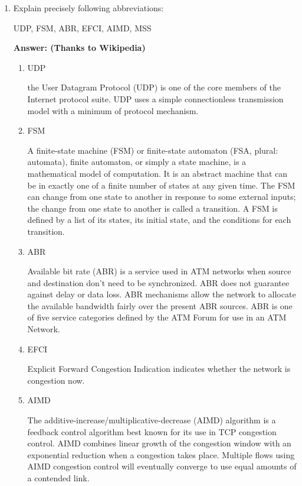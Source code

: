 \begin{enumerate}
	\item Explain precisely following abbreviations:
	
	UDP, FSM, ABR, EFCI, AIMD, MSS
	
	\textbf{Answer: (Thanks to Wikipedia)}
	
	\begin{enumerate}
	    \item UDP
	    
	    the User Datagram Protocol (UDP) is one of the core members of the Internet protocol suite. UDP uses a simple connectionless transmission model with a minimum of protocol mechanism. 
	    
	    \item FSM
	    
	    A finite-state machine (FSM) or finite-state automaton (FSA, plural: automata), finite automaton, or simply a state machine, is a mathematical model of computation. It is an abstract machine that can be in exactly one of a finite number of states at any given time. The FSM can change from one state to another in response to some external inputs; the change from one state to another is called a transition. A FSM is defined by a list of its states, its initial state, and the conditions for each transition.
	    
	    \item ABR
	    
	    Available bit rate (ABR) is a service used in ATM networks when source and destination don't need to be synchronized. ABR does not guarantee against delay or data loss. ABR mechanisms allow the network to allocate the available bandwidth fairly over the present ABR sources. ABR is one of five service categories defined by the ATM Forum for use in an ATM Network.
	    
	    \item EFCI
	    
	    Explicit Forward Congestion Indication indicates whether the network is congestion now.
	    
	    \item AIMD
	    
	    The additive-increase/multiplicative-decrease (AIMD) algorithm is a feedback control algorithm best known for its use in TCP congestion control. AIMD combines linear growth of the congestion window with an exponential reduction when a congestion takes place. Multiple flows using AIMD congestion control will eventually converge to use equal amounts of a contended link.
	    

\end{enumerate}
\end{enumerate}
